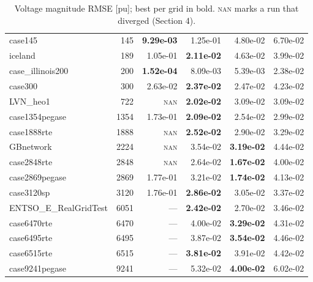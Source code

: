 \documentclass[10pt]{article}
\begin{document}
\begin{table}[H]
\begin{tabular}{lr rrrr}
case145 & 145 & \textbf{9.29e-03} & 1.25e-01 & 4.80e-02 & 6.70e-02 \\
iceland & 189 & 1.05e-01 & \textbf{2.11e-02} & 4.63e-02 & 3.99e-02 \\
case\_illinois200 & 200 & \textbf{1.52e-04} & 8.09e-03 & 5.39e-03 & 2.38e-02 \\
case300 & 300 & 2.63e-02 & \textbf{2.37e-02} & 2.47e-02 & 4.23e-02 \\
LVN\_heo1 & 722 & \textsc{nan} & \textbf{2.02e-02} & 3.09e-02 & 3.09e-02 \\
case1354pegase & 1354 & 1.73e-01 & \textbf{2.09e-02} & 2.54e-02 & 2.99e-02 \\
case1888rte & 1888 & \textsc{nan} & \textbf{2.52e-02} & 2.90e-02 & 3.29e-02 \\
GBnetwork & 2224 & \textsc{nan} & 3.54e-02 & \textbf{3.19e-02} & 4.44e-02 \\
case2848rte & 2848 & \textsc{nan} & 2.64e-02 & \textbf{1.67e-02} & 4.00e-02 \\
case2869pegase & 2869 & 1.77e-01 & 3.21e-02 & \textbf{1.74e-02} & 4.13e-02 \\
case3120sp & 3120 & 1.76e-01 & \textbf{2.86e-02} & 3.05e-02 & 3.37e-02 \\
ENTSO\_E\_RealGridTest & 6051 & --- & \textbf{2.42e-02} & 2.70e-02 & 3.46e-02 \\
case6470rte & 6470 & --- & 4.00e-02 & \textbf{3.29e-02} & 4.31e-02 \\
case6495rte & 6495 & --- & 3.87e-02 & \textbf{3.54e-02} & 4.46e-02 \\
case6515rte & 6515 & --- & \textbf{3.81e-02} & 3.91e-02 & 4.42e-02 \\
case9241pegase & 9241 & --- & 5.32e-02 & \textbf{4.00e-02} & 6.02e-02 \\
\bottomrule
\end{tabular}
\caption{Voltage magnitude RMSE [pu]; best per grid in bold. \textsc{nan} marks a run that diverged (Section 4).}
\end{table}
\end{document}
